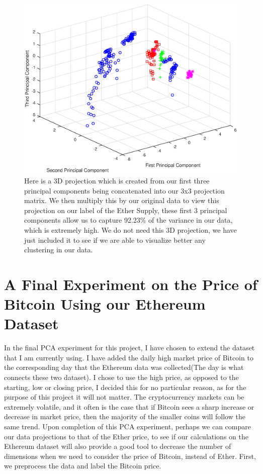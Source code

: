 \documentclass{article}
\begin{document}
\begin{figure}[H]
\centering
\caption{Here is a 3D projection which is created from our first three principal components being concatenated into our 3x3 projection matrix. We then multiply this by our original data to view this projection on our label of the Ether Supply, these first 3 principal components allow us to capture 92.23\% of the variance in our data, which is extremely high. We do not need this 3D projection, we have just included it to see if we are able to visualize better any clustering in our data.}
\includegraphics{local/supply_3d_projection.eps}
\end{figure}

\section{A Final Experiment on the Price of Bitcoin Using our Ethereum Dataset}

In the final PCA experiment for this project, I have chosen to extend the dataset that I am currently using. I have added the daily high market price of Bitcoin to the corresponding day that the Ethereum data was collected(The day is what connects these two dataset). I chose to use the high price, as opposed to the starting, low or closing price, I decided this for no particular reason, as for the purpose of this project it will not matter. The cryptocurrency markets can be extremely volatile, and it often is the case that if Bitcoin sees a sharp increase or decrease in market price, then the majority of the smaller coins will follow the same trend. Upon completion of this PCA experiment, perhaps we can compare our data projections to that of the Ether price, to see if our calculations on the Ethereum dataset will also provide a good tool to decrease the number of dimensions when we need to consider the price of Bitcoin, instead of Ether. First, we preprocess the data and label the Bitcoin price.
\end{document}
